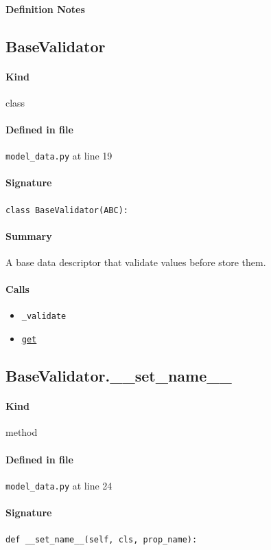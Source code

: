 \documentclass[11pt]{report}
\begin{document}
\paragraph{Definition Notes}
\subsection{BaseValidator}
\label{def:model_data.py:BaseValidator:L19}
\paragraph{Kind} class
\paragraph{Defined in file} \texttt{model\_data.py} at line 19
\paragraph{Signature} \texttt{class BaseValidator(ABC):}
\paragraph{Summary} A base data descriptor that validate values before store them.
\paragraph{Calls}
\begin{itemize}[leftmargin=*]
  \item \texttt{\_validate}
  \item \hyperref[def:tests-test_backcaster.py:DAPrices.get:L294]{\texttt{get}}
\end{itemize}
\subsection{BaseValidator.\_\_set\_name\_\_}
\label{def:model_data.py:BaseValidator.__set_name__:L24}
\paragraph{Kind} method
\paragraph{Defined in file} \texttt{model\_data.py} at line 24
\paragraph{Signature} \texttt{def \_\_set\_name\_\_(self, cls, prop\_name):}
\end{document}
